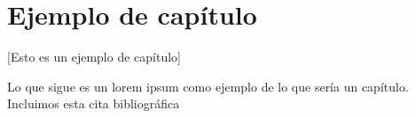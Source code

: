 \chapter{Ejemplo de capítulo}

[Esto es un ejemplo de capítulo]

Lo que sigue es un lorem ipsum como ejemplo de lo que sería un capítulo. Incluimos esta cita bibliográfica \cite{recomendaciones}

\lipsum


